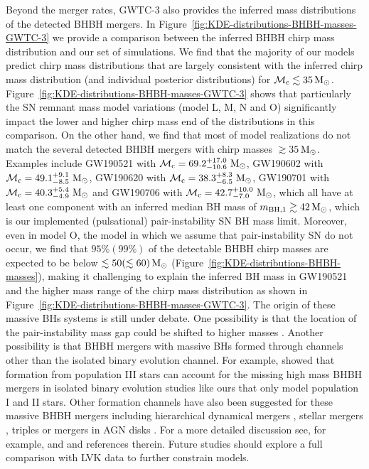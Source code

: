 \documentclass[fleqn,usenatbib]{mnras}
\newcommand{\Msun}{\ensuremath{\,\rm{M}_{\odot}}\xspace}
\newcommand{\mbhfone}{\ensuremath{m_{\rm{BH,1}}}\xspace}
\newcommand{\mchirpf}{\ensuremath{{\mathcal{M}}_{\rm{c}}}\xspace}
\begin{document}
Beyond the merger rates, GWTC-3 also provides the inferred mass distributions of the detected BHBH mergers. In Figure~\ref{fig:KDE-distributions-BHBH-masses-GWTC-3} we provide a comparison between the inferred BHBH chirp mass distribution and our set of simulations. We find that the majority of our models predict chirp mass distributions that are largely consistent with the inferred chirp mass distribution (and individual posterior distributions) for $\mchirpf \lesssim 35\Msun$. Figure~\ref{fig:KDE-distributions-BHBH-masses-GWTC-3} shows that particularly the SN remnant mass model variations (model L, M, N and O) significantly impact the lower and higher chirp mass end of the distributions in this comparison. On the other hand, we find that most of model realizations do not match the several detected BHBH mergers with chirp masses $\gtrsim 35$\Msun.  Examples include GW190521 with $\mchirpf = 69.2^{+17.0}_{-10.6}$\Msun, GW190602 with $\mchirpf = 49.1^{+9.1}_{-8.5}$\Msun,  GW190620 with $\mchirpf = 38.3^{+8.3}_{-6.5}$\Msun,  GW190701 with $\mchirpf = 40.3^{+5.4}_{-4.9}$\Msun and GW190706 with $\mchirpf = 42.7^{+10.0}_{-7.0}$\Msun, which all have at least one component with an inferred median BH mass of $\mbhfone \gtrsim 42\Msun$, which is our implemented (pulsational) pair-instability SN BH mass limit. Moreover, even in model O, the model in which we assume that pair-instability \ac{SN} do not occur, we find that $95\% (99\%)$ of the detectable \ac{BHBH} chirp masses are expected to be below $\lesssim 50 (\lesssim 60)\Msun$ (Figure~\ref{fig:KDE-distributions-BHBH-masses}), making it challenging to explain the inferred BH mass in GW190521 and the higher mass range of the chirp mass distribution as shown in Figure~\ref{fig:KDE-distributions-BHBH-masses-GWTC-3}.  The origin of these massive \acp{BH} systems is still under debate.  One possibility is that the location of the pair-instability mass gap could be shifted to higher masses \citep[e.g.][]{2017MNRAS.470.4739S,Farmer:2019, 2020ApJ...902L..36F, 2021MNRAS.501.4514C,Mehta:2021,2021arXiv210307933W}. Another possibility is that BHBH mergers with massive \acp{BH} formed through channels other than the isolated binary evolution channel. For example, \citet[][]{Tanikawa:2021} showed that formation from population III stars can account for the missing high mass BHBH mergers in isolated binary evolution studies like ours that only model population I and II stars. Other formation channels have also been suggested for these massive BHBH mergers including  hierarchical dynamical mergers \citep[e.g.][]{Rodriguez:2015,2016PhRvD..93h4029R, 2020arXiv201006161A}, stellar mergers \citep[e.g.][]{2019MNRAS.485..889S, 2020MNRAS.497.1043D,2020ApJ...903...45K}, triples \citep[e.g.][]{2021ApJ...907L..19V} or mergers in AGN disks \citep[e.g.][]{2020ApJ...903..133S}. For a more detailed discussion see, for example,  \citet{2020ApJ...900L..13A} and \citet{2020arXiv201105332K} and references therein. Future studies should explore a full comparison with LVK data to further constrain models. 
\end{document}
